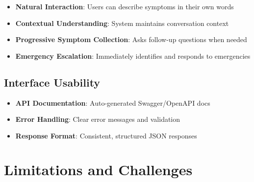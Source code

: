\begin{itemize}
    \item \textbf{Natural Interaction}: Users can describe symptoms in their own words
    \item \textbf{Contextual Understanding}: System maintains conversation context
    \item \textbf{Progressive Symptom Collection}: Asks follow-up questions when needed
    \item \textbf{Emergency Escalation}: Immediately identifies and responds to emergencies
\end{itemize}

\subsection{Interface Usability}
\begin{itemize}
    \item \textbf{API Documentation}: Auto-generated Swagger/OpenAPI docs
    \item \textbf{Error Handling}: Clear error messages and validation
    \item \textbf{Response Format}: Consistent, structured JSON responses
\end{itemize}

\section{Limitations and Challenges}

